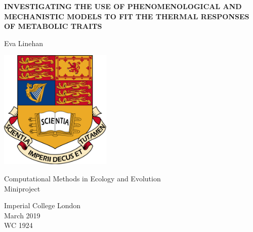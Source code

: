 \documentclass[12pt]{article}
\begin{document}
\begin{titlepage}
		\centering
		
		\vspace{1cm}
		{\uppercase{\textbf{\Large Investigating the use of Phenomenological and Mechanistic Models to Fit the Thermal Responses of Metabolic Traits\\}}}
		\vspace{1cm}
		{\Large Eva Linehan\par}
		\vspace{2cm}
		
		\includegraphics[width=0.4\textwidth]{crest.png}
		
		\vspace{1.7cm}
		
		Computational Methods in Ecology and Evolution\\
		Miniproject
		
		\vspace{0.8cm}
		
		Imperial College London\\
		March 2019\\
		WC 1924
\end{titlepage}


\end{document}
